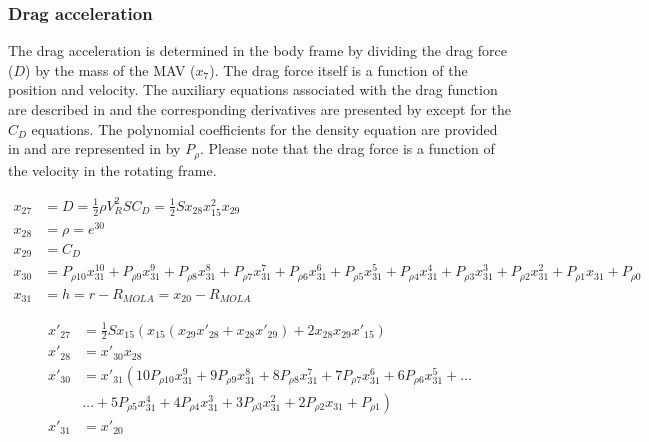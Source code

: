  \subsubsection{Drag acceleration}
 \label{subsubsec:tsiDrag}
The drag acceleration is determined in the body frame by dividing the drag force ($D$) by the mass of the \ac{MAV} ($x_{7}$). The drag force itself is a function of the position and velocity. The auxiliary equations associated with the drag function are described in  and the corresponding derivatives are presented by  except for the $C_{D}$ equations. The polynomial coefficients for the density equation are provided in  and are represented in  by $P_{\rho}$. Please note that the drag force is a function of the velocity in the rotating frame.

 \begin{equation} \label{eq:dragAux}
\begin{split}
x_{27} &= D = \frac{1}{2}\rho V_{R}^{2}SC_{D} = \frac{1}{2}S x_{28}x_{15}^{2}x_{29} \\
x_{28} &= \rho = e^{30} \\
x_{29} &= C_{D} \\
x_{30} &= P_{\rho 10}x_{31}^{10}+P_{\rho 9}x_{31}^{9}+P_{\rho 8}x_{31}^{8}+P_{\rho 7}x_{31}^{7}+P_{\rho 6}x_{31}^{6}+P_{\rho 5}x_{31}^{5}+P_{\rho 4}x_{31}^{4}+P_{\rho 3}x_{31}^{3}+P_{\rho 2}x_{31}^{2}+P_{\rho 1}x_{31}+P_{\rho 0} \\
x_{31} &= h = r-R_{MOLA} = x_{20}-R_{MOLA}
\end{split}
\end{equation}

 \begin{equation} \label{eq:dragDerAux}
\begin{split}
x'_{27} &= \frac{1}{2}Sx_{15}\left(x_{15} \left(x_{29}x'_{28}+x_{28}x'_{29}\right)+2x_{28}x_{29}x'_{15}\right) \\
x'_{28} &= x'_{30}x_{28} \\
x'_{30} &=x'_{31} \left(10 P_{\rho 10}x_{31}^{9}+9 P_{\rho 9}x_{31}^{8}+8 P_{\rho 8}x_{31}^{7}+7 P_{\rho 7}x_{31}^{6}+6 P_{\rho 6}x_{31}^{5}+\dots \right. \\
&  \left. \dotsc +5 P_{\rho 5}x_{31}^{4}+4 P_{\rho 4}x_{31}^{3}+3 P_{\rho 3}x_{31}^{2}+2 P_{\rho 2}x_{31}+P_{\rho 1}\right) \\
x'_{31} &= x'_{20}
\end{split}
\end{equation}

